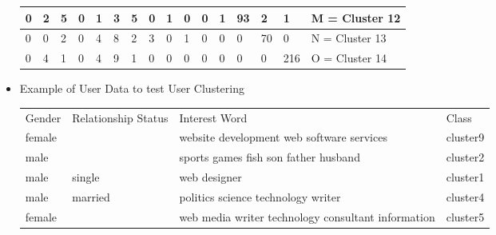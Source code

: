 \begin{itemize}
\begin{table}[H]
\begin{tabular}{|l|l|l|l|l|l|l|l|l|l|l|l|l|l|l|l|}
    0   & 2   & 5    & 0 & 1   & 3   & 5  & 0 & 1  & 0   & 0  & 1  & 93 & 2  & 1   & M = Cluster 12   \\ \hline
    0   & 0   & 2    & 0 & 4   & 8   & 2  & 3 & 0  & 1   & 0  & 0  & 0  & 70 & 0   & N = Cluster 13   \\ \hline
    0   & 4   & 1    & 0 & 4   & 9   & 1  & 0 & 0  & 0   & 0  & 0  & 0  & 0  & 216 & O = Cluster 14   \\ \hline
    \end{tabular}
\end{table}
\item Example of User Data to test User Clustering
\begin{table}
    \begin{tabular}{|l|l|l|l|}
    Gender & Relationship Status & Interest Word                                      & Class    \\
    female & ~                   & website development web  software services         & cluster9 \\
    male   & ~                   & sports games fish son father husband               & cluster2 \\
    male   & single              & web designer                                       & cluster1 \\
    male   & married             & politics science technology writer                 & cluster4 \\
    female & ~                   & web media writer technology consultant information & cluster5 \\
    \end{tabular}
\end{table}
\end{itemize}
